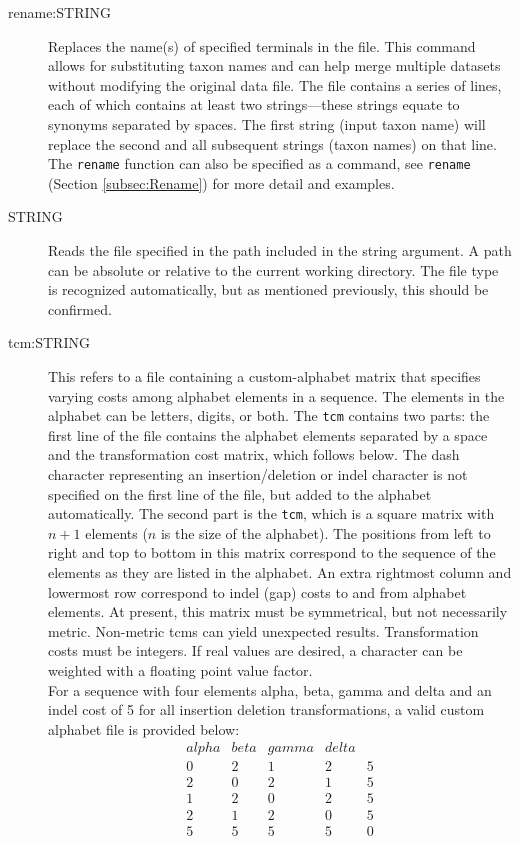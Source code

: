 \begin{description}
		\item [rename:STRING] Replaces the name(s) of specified terminals in the file. This 
		command allows for substituting taxon names and can help merge multiple datasets without 
		modifying the original data file. The file contains a series of lines, each of which contains at 
		least two strings---these strings equate to synonyms separated by spaces. The first string 
		(input taxon name) will replace the second and all subsequent strings (taxon names) on 
		that line. The \texttt{rename} function can also be specified as a command, see \texttt{rename}
		(Section \ref{subsec:Rename}) for more detail and examples.
					 
		\item[STRING] Reads the file specified in the path included in the string argument. A path 
		can be absolute or relative to the current working directory. The file type is recognized
		automatically, but as mentioned previously, this should be confirmed.

		\item [tcm:STRING] This refers to a file containing a custom-alphabet matrix that 
		specifies varying costs among alphabet elements in a sequence. The elements in 
		the alphabet can be letters, digits, or both.
		The \texttt{tcm} contains two parts: the first line of the file contains the alphabet elements 
		separated by a space and the transformation cost matrix, which follows below. The dash 
		character representing an insertion/deletion or indel character is not specified on the first 
		line of the file, but added to the alphabet automatically. The second part is the \texttt{tcm}, 
		which is a square matrix with $n + 1$ elements ($n$ is the size of the alphabet). 
		The positions from left to right and top to bottom in this matrix correspond to the sequence 
		of the elements as they are listed in the alphabet. An extra rightmost column and lowermost
		row correspond to indel (gap) costs to and from alphabet elements. At present, this matrix 
		must be symmetrical, but not necessarily metric. Non-metric tcms can yield unexpected 
		results. Transformation costs must be integers. If real values are desired, a character can 
		be weighted with a floating point value factor. \\
		
		For a sequence with four elements alpha, beta, gamma and delta and an indel cost of 5 
		for all insertion deletion transformations, a valid custom alphabet file is provided below:
		\\
		\begin{equation*}
		\begin{array}{lllll}
		alpha & beta & gamma & delta &  \\
		0 &   2 &  1 &   2 &   5 \\
		2 &   0 &  2 &   1 &   5 \\
		1 &   2 &  0 &   2 &   5 \\
		2 &   1 &  2 &   0 &   5 \\
		5 &   5 &  5 &   5 &   0
		\end{array}
		\end{equation*} 
		\\
		

\end{description}
